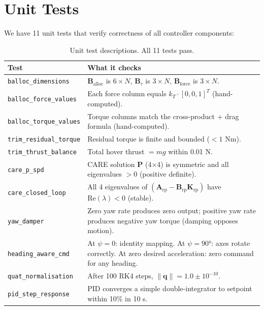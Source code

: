 \documentclass[12pt, a4paper]{article}
\newcommand{\bq}{\bm{q}}
\newcommand{\bK}{\bm{K}}
\newcommand{\bA}{\bm{A}}
\newcommand{\bB}{\bm{B}}
\newcommand{\bP}{\bm{P}}
\begin{document}
\section{Unit Tests}
\label{sec:tests}

We have 11 unit tests that verify correctness of all controller components:

\begin{table}[H]
\centering
\small
\begin{tabular}{lp{8cm}}
\toprule
\textbf{Test} & \textbf{What it checks} \\
\midrule
\texttt{balloc\_dimensions} & $\bB_{\text{alloc}}$ is $6 \times N$, $\bB_\tau$ is $3 \times N$, $\bB_{\text{force}}$ is $3 \times N$. \\
\texttt{balloc\_force\_values} & Each force column equals $k_T \cdot [0,0,1]^T$ (hand-computed). \\
\texttt{balloc\_torque\_values} & Torque columns match the cross-product + drag formula (hand-computed). \\
\texttt{trim\_residual\_torque} & Residual torque is finite and bounded ($< 1$ Nm). \\
\texttt{trim\_thrust\_balance} & Total hover thrust $= mg$ within 0.01 N. \\
\texttt{care\_p\_spd} & CARE solution $\bP$ (4$\times$4) is symmetric and all eigenvalues $> 0$ (positive definite). \\
\texttt{care\_closed\_loop} & All 4 eigenvalues of $(\bA_{\text{rp}} - \bB_{\text{rp}}\bK_{\text{rp}})$ have $\text{Re}(\lambda) < 0$ (stable). \\
\texttt{yaw\_damper} & Zero yaw rate produces zero output; positive yaw rate produces negative yaw torque (damping opposes motion). \\
\texttt{heading\_aware\_cmd} & At $\psi = 0$: identity mapping.  At $\psi = 90°$: axes rotate correctly.  At zero desired acceleration: zero command for any heading. \\
\texttt{quat\_normalisation} & After 100 RK4 steps, $\|\bq\| = 1.0 \pm 10^{-10}$. \\
\texttt{pid\_step\_response} & PID converges a simple double-integrator to setpoint within 10\% in 10 s. \\
\bottomrule
\end{tabular}
\caption{Unit test descriptions.  All 11 tests pass.}
\end{table}
\end{document}
